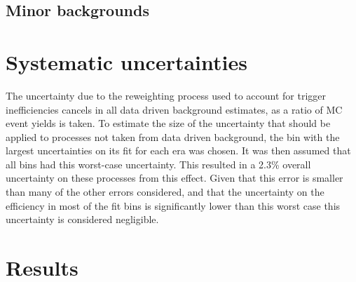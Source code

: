 \subsection{Minor backgrounds}%
\label{sec:parkedminor}

\section{Systematic uncertainties}%
\label{sec:parkedsyst}
The uncertainty due to the reweighting process used to account for trigger inefficiencies cancels in all data driven background estimates, as a ratio of \ac{MC} event yields is taken. To estimate the size of the uncertainty that should be applied to processes not taken from data driven background, the bin with the largest uncertainties on its fit for each era was chosen. It was then assumed that all bins had this worst-case uncertainty. This resulted in a 2.3\% overall uncertainty on these processes from this effect. Given that this error is smaller than many of the other errors considered, and that the uncertainty on the efficiency in most of the fit bins is significantly lower than this worst case this uncertainty is considered negligible.



\section{Results}%
\label{sec:parkedresults}
